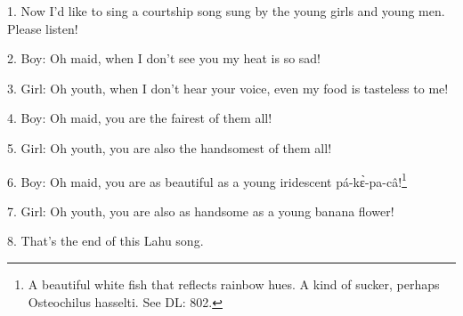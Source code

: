 \setcounter{footnote}{0}

1. Now I'd like to sing a courtship song sung by the young girls and young men.
Please listen!

2. Boy: Oh maid, when I don't see you my heat is so sad!

3. Girl: Oh youth, when I don't hear your voice, even my food is tasteless to me!

4. Boy: Oh maid, you are the fairest of them all!

5. Girl: Oh youth, you are also the handsomest of them all!

6. Boy: Oh maid, you are as beautiful as a young iridescent pá-kɛ̀-pa-câ!\footnote{A beautiful white fish that reflects rainbow hues. A kind of sucker, perhaps Osteochilus hasselti. See DL: 802.}

7. Girl: Oh youth, you are also as handsome as a young banana flower!

8. That's the end of this Lahu song.

